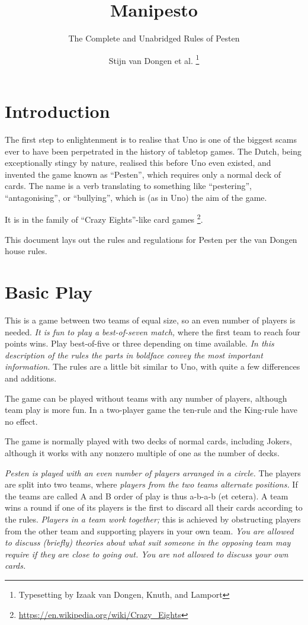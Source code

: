 \documentclass[a4paper,11pt,headings=standardclasses,parskip=half]{scrartcl}
\title{Manipesto}
\subtitle{The Complete and Unabridged Rules of Pesten}
\author{Stijn van Dongen et al.
        \thanks{Typesetting by Izaak van Dongen, Knuth, and Lamport}}
\begin{document}
 \maketitle\thispagestyle{empty} %

 \section{Introduction}

 The first step to enlightenment is to realise that Uno is one of the biggest
 scams ever to have been perpetrated in the history of tabletop games. The
 Dutch, being exceptionally stingy by nature, realised this before Uno even
 existed, and invented the game known as ``Pesten'', which requires only a
 normal deck of cards. The name is a verb translating to something like
 ``pestering'', ``antagonising'', or ``bullying'', which is (as in Uno) the aim
 of the game.

 It is in the family of ``Crazy Eights''-like card games
 \footnote{\url{https://en.wikipedia.org/wiki/Crazy_Eights}}.

 This document lays out the rules and regulations for Pesten per the van Dongen
 house rules.

 \section{Basic Play}

 This is a game between two teams of equal size, so an even number of players is
 needed. \emph{It is fun to play a best-of-seven match,} where the first team to
 reach four points wins. Play best-of-five or three depending on time available.
 \emph{In this description of the rules the parts in boldface convey the most
 important information.} The rules are a little bit similar to Uno, with quite a
 few differences and additions.

 The game can be played without teams with any number of players, although team
 play is more fun. In a two-player game the ten-rule and the King-rule have no
 effect.

 The game is normally played with two decks of normal cards, including Jokers,
 although it works with any nonzero multiple of one as the number of decks.

 \emph{Pesten is played with an even number of players arranged in a circle.}
 The players are split into two teams, where \emph{players from the two teams
 alternate positions.} If the teams are called A and B order of play is thus
 a-b-a-b (et cetera). A team wins a round if one of its players is the first to
 discard all their cards according to the rules. \emph{Players in a team work
 together;} this is achieved by obstructing players from the other team and
 supporting players in your own team. \emph{You are allowed to discuss (briefly)
 theories about what suit someone in the opposing team may require if they are
 close to going out. You are not allowed to discuss your own cards.}
\end{document}
